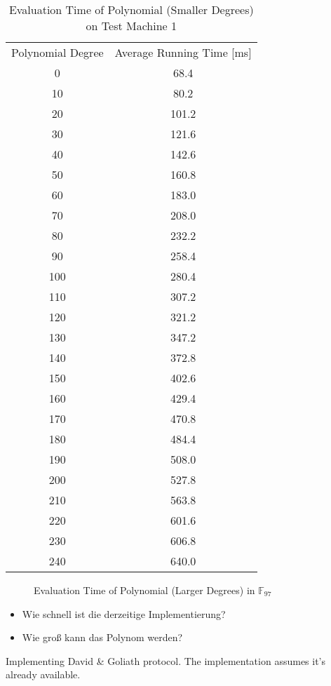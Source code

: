 \begin{table}[ht]
  \centering
  \begin{tabular}{|c|c|}
    Polynomial Degree & Average Running Time [ms] \\
    0  & 68.4 \\
    10 &  80.2 \\
    20 & 101.2 \\
    30 & 121.6 \\
    40 & 142.6 \\
    50 & 160.8 \\
    60 & 183.0 \\
    70 & 208.0 \\
    80 & 232.2 \\
    90 & 258.4 \\
    100 & 280.4 \\
    110 & 307.2 \\
    120 & 321.2 \\
    130 & 347.2 \\
    140 & 372.8 \\
    150 & 402.6 \\
    160 & 429.4 \\
    170 & 470.8 \\
    180 & 484.4 \\
    190 & 508.0 \\
    200 & 527.8 \\
    210 & 563.8 \\
    220 & 601.6 \\
    230 & 606.8 \\
    240 & 640.0 \\
  \end{tabular}
  \caption{Evaluation Time of Polynomial (Smaller Degrees) on Test Machine 1}
  \label{tab:poly-deg-t-small}
\end{table}


\begin{figure}[ht]
  \centering
  
  \caption{Evaluation Time of Polynomial (Larger Degrees) in $\mathbb{F}_{97}$}
  \label{fig:f97-poly-deg-t}
\end{figure}



\begin{JWtodoBox}

\begin{itemize}

\item Wie schnell ist die derzeitige Implementierung?

\item Wie groß kann das Polynom werden?

\end{itemize}

\end{JWtodoBox}



Implementing David \& Goliath protocol. The implementation assumes it's already
available.


